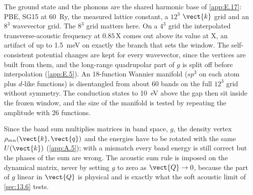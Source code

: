 The ground state and the phonons are the shared harmonic base of \cref{app:E.17}: PBE, SG15 at \SI{60}{Ry}, the measured lattice constant, a $12^3$ $\vect{k}$ grid and an $8^3$ wavevector grid. The $8^3$ grid matters here. On a $4^3$ grid the interpolated transverse-acoustic frequency at $0.85\,\mathrm{X}$ comes out above its value at X, an artifact of up to \SI{1.5}{meV} on exactly the branch that sets the window. The self-consistent potential changes are kept for every wavevector, since the vertices are built from them, and the long-range quadrupolar part of $g$ is split off before interpolation (\cref{app:E.5}). An 18-function Wannier manifold ($sp^3$ on each atom plus $d$-like functions) is disentangled from about 60 bands on the full $12^3$ grid without symmetry. The conduction states to \SI{10}{eV} above the gap then sit inside the frozen window, and the size of the manifold is tested by repeating the amplitude with 26 functions.

Since the band sum multiplies matrices in band space, $g$, the density vertex $\rho_{mn}(\vect{k},\vect{q})$ and the energies have to be rotated with the same $U(\vect{k})$ (\cref{app:A.5}); with a mismatch every band energy is still correct but the phases of the sum are wrong. The acoustic sum rule is imposed on the dynamical matrix, never by setting $g$ to zero as $\vect{Q}\to0$, because the part of $g$ linear in $\vect{Q}$ is physical and is exactly what the soft acoustic limit of \cref{sec:13.6} tests.


